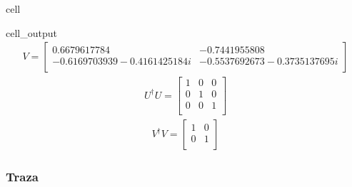 \documentclass[letterpaper,10pt,english]{jupyterBook}
\begin{document}
\begin{sphinxuseclass}{cell}
\begin{sphinxVerbatimOutput}
\begin{sphinxuseclass}{cell_output}
\begin{equation*}
\begin{split}
V=
\begin{bmatrix}
0.6679617784 & -0.7441955808  \\
 -0.6169703939 - 0.4161425184 i & -0.5537692673 - 0.3735137695 i  \\
 \end{bmatrix}
\end{split}
\end{equation*}\begin{equation*}
\begin{split}
U^{\dagger}U =
\begin{bmatrix}
1 & 0 & 0  \\
 0 & 1 & 0  \\
 0 & 0 & 1  \\
 \end{bmatrix}
\end{split}
\end{equation*}\begin{equation*}
\begin{split}
V^{\dagger}V =
\begin{bmatrix}
1 & 0  \\
 0 & 1  \\
 \end{bmatrix}
\end{split}
\end{equation*}
\end{sphinxuseclass}\end{sphinxVerbatimOutput}

\end{sphinxuseclass}

\subsubsection{Traza}
\label{\detokenize{docs/Part_01_Formalismo/Chapter_01_02_Formalismo_matem_xe1tico/01_03_Operadores_myst:traza}}
\end{document}

